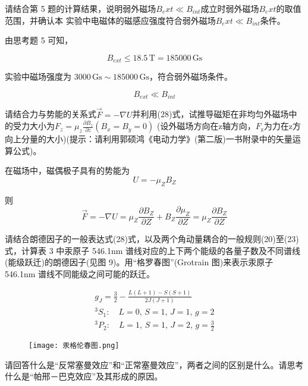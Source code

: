 \documentclass[dvipsnames, svgnames,a4paper,11pt]{article}
\begin{document}
\begin{question}
	请结合第 5 题的计算结果，说明弱外磁场$B_ext\ll B_{int}$成立时弱外磁场$B_ext$的取值范围，并确认本
	实验中电磁体的磁感应强度符合弱外磁场$B_ext\ll B_{int}$条件。
\end{question}
由思考题 5 可知，

\begin{equation}
B_{ext} \leq 18.5\, \mathrm{T} = 185000\, \mathrm{Gs}
\end{equation}

实验中磁场强度为 $3000\, \mathrm{Gs} \sim 185000\, \mathrm{Gs}$，符合弱外磁场条件。

\begin{equation}
B_{ext} \ll B_{int}
\end{equation}



\begin{question}
	 请结合力与势能的关系式$\vec{F}=-\nabla U$并利用(28)式，试推导磁矩在非均匀外磁场中的受力大小为$F_{z}= \mu _{z}\frac {\partial B_{z}}{\partial z}( B_{x}= B_{y}= 0)$ (设外磁场方向在z轴方向，$F_\mathrm{z}$为力在z方向上分量的大小)(提示：请利用郭硕鸿《电动力学》(第二版)一书附录中的矢量运算公式)。
\end{question}
在磁场中，磁偶极子具有的势能为$$U=-\mu_ZB_Z$$

则$$\vec{F}=-\nabla U=\mu_Z\frac{\partial B_Z}{\partial Z}+B_Z\frac{\partial\mu_Z}{\partial Z}{=}\mu_Z\frac{\partial B_Z}{\partial Z}$$

\begin{question}
	请结合朗德因子的一般表达式(28)式，以及两个角动量耦合的一般规则(20)至(23) 式，计算表 3 中汞原子 546.1nm 谱线对应的上下两个能级的各量子数及不同谱线(能级跃迁)的朗德因子(见图 9)。用“格罗春图”(Grotrain 图)来表示汞原子 546.1nm 谱线不同能级之间可能的跃迁。
\end{question}
\begin{gather*}
	g_J = \frac{3}{2} - \frac{L(L+1) - S(S+1)}{2J(J+1)} \\
	^3S_1: \quad L = 0, \, S = 1, \, J = 1, \, g = 2 \\
	^3P_2: \quad L = 1, \, S = 1, \, J = 2, \, g = \frac{3}{2}
	\end{gather*}
\begin{figure}[{H}]
	\centering
	\texttt{[image: 汞格伦春图.png]}
	
\end{figure}
\begin{question}
	请回答什么是“反常塞曼效应”和“正常塞曼效应”，两者之间的区别是什么。请思考
	什么是“帕邢－巴克效应”及其形成的原因。
\end{question}
\end{document}
